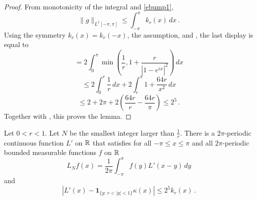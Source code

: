 \begin{proof}
From monotonicity of the integral and \eqref{ebump1},
\begin{equation}
    \|g\|_{L^1[-\pi, \pi]} \le \int_{-\pi}^{\pi}k_r(x)\, dx\,.
\end{equation}
Using the symmetry
$k_r(x)=k_r(-x)$, the assumption, and , the last display
is equal to
\begin{equation*}
    = 2 \int_0^\pi \min\left(\frac 1r, 1+\frac r{|1-e^{ix}|^2}\right)\, dx
\end{equation*}
\begin{equation*}
    \le 2\int_0^{r} \frac 1r \, dx+2\int_r^{\pi}1+\frac {64r}{x^2}\, dx
\end{equation*}
\begin{equation}
    \le 2+2\pi + 2\left(\frac {64r}r-\frac {64r}{\pi}\right)
    \le 2^{5}\, .
\end{equation}
    Together with , this proves the lemma.
\end{proof}

\begin{lemma}\label{Dirichlet-approximation}
Let $0<r<1$. Let $N$ be the smallest
integer larger than $\frac 1r$.
There is a $2\pi$-periodic continuous function
 ${L'}$ on ${\mathbb{R}}$ that satisfies for all $-\pi\le x\le \pi$
and all $2\pi$-periodic bounded measurable functions $f$ on ${\mathbb{R}}$
\begin{equation}\label{lthroughlprime}
    L_Nf(x)=\frac 1{2\pi}\int_{-\pi}^{\pi}f(y) {L'}(x-y)\, dy
\end{equation}
and
\begin{equation}\label{eqdifflhil}
    \left|L'(x)-\mathbf{1}_{\{y:\, r<|y|<1\}} \kappa(x)\right|\le 2^{5}k_r(x)\, .
\end{equation}
\end{lemma}


